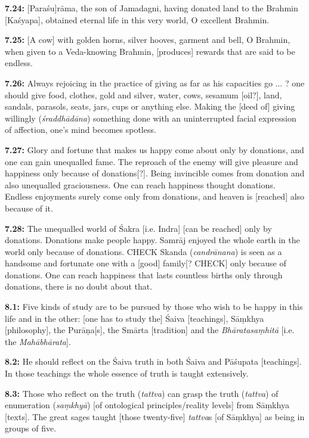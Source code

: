 \documentclass{article}
\newcommand{\vsnum}[1]{\textbf{#1}}
\newcommand{\skt}[1]{\textit{#1}}
\begin{document}
\vsnum{7.24: }[Paraśu]rāma, the son of Jamadagni, having donated land to the Brahmin [Kaśyapa], obtained eternal life in this very world, O excellent Brahmin.

\vsnum{7.25: }[A cow] with golden horns, silver hooves, garment and bell, O Brahmin, when given to a Veda-knowing Brahmin, [produces] rewards that are said to be endless.

\vsnum{7.26: }Always rejoicing in the practice of giving as far as his capacities go ... ? one should give food, clothes, gold and silver, water, cows, sesamum [oil?], land, sandals, parasols, seats, jars, cups or anything else. Making the [deed of] giving willingly (\skt{śraddhādāna}) something done with an uninterrupted facial expression of affection, one's mind becomes spotless.

\vsnum{7.27: }Glory and fortune that makes us happy come about only by donations, and one can gain unequalled fame. The reproach of the enemy will give pleasure and happiness only because of donations[?]. Being invincible comes from donation and also unequalled graciousness. One can reach happiness thought donations. Endless enjoyments surely come only from donations, and heaven is [reached] also because of it.

\vsnum{7.28: }The unequalled world of Śakra [i.e. Indra] [can be reached] only by donations. Donations make people happy. Samrāj enjoyed the whole earth in the world only because of donations. CHECK Skanda (\skt{candrānana}) is seen as a handsome and fortunate one with a [good] family[? CHECK] only because of donations. One can reach happiness that lasts countless births only through donations, there is no doubt about that.


\vsnum{8.1: }Five kinds of study are to be pursued by those who wish to be happy in this life and in the other: [one has to study the] Śaiva [teachings], Sāṃkhya [philosophy], the Purāṇa[s], the Smārta [tradition] and the \skt{Bhāratasaṃhitā} [i.e. the \skt{Mahābhārata}].

\vsnum{8.2: }He should reflect on the Śaiva truth in both Śaiva and Pāśupata [teachings]. In those teachings the whole essence of truth is taught extensively.

\vsnum{8.3: }Those who reflect on the truth (\skt{tattva}) can grasp the truth (\skt{tattva}) of enumeration (\skt{saṃkhyā}) [of ontological principles/reality levels] from Sāṃkhya [texts]. The great sages taught [those twenty-five] \skt{tattva}s [of Sāṃkhya] as being in groups of five.
\end{document}
